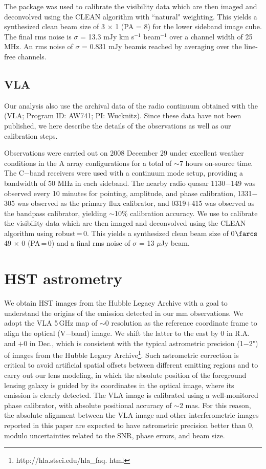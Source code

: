 \documentclass[]{emulateapj}
\begin{document}
The  package was used to calibrate the visibility data which are
then imaged and deconvolved using the CLEAN algorithm with ``natural" weighting. This yields a synthesized clean
beam size of 3 $\times$ 1 (PA = 8\degr) for the lower sideband
image cube. The final rms noise is $\sigma$ = 13.3 mJy km s$^{-1}$ beam$^{-1}$
over a channel width of 25 MHz. An rms noise of
$\sigma$ = 0.831 mJy beam\pmOne is reached by averaging over the
line-free channels.

\subsection{VLA} %
Our analysis also use the archival data of the radio continuum obtained with the \vla (VLA; Program ID: AW741; PI: Wucknitz). Since these data have not been
published, we here describe the details of the observations as well as our calibration steps.

Observations were carried out on 2008 December 29 under excellent weather
conditions in the A array configurations for a total of $\sim$7 hours on-source time. The C$-$band receivers were used with a continuum mode setup,
providing a bandwidth of 50 MHz in each sideband.
The nearby radio quasar 1130$-$149 was observed every 10 minutes for
pointing, amplitude, and phase calibration, 1331$-$305 was observed as the
primary flux calibrator, and 0319$+$415 was observed as the bandpass
calibrator, yielding $\sim$10\% calibration accuracy.
We use \aips to calibrate the visibility data which
are then imaged and deconvolved using
the CLEAN algorithm using robust\,=\,0. This yields a synthesized clean
beam size of 0$\farcs$49 $\times$ 0 (PA\,=\,0) and a final
rms noise of $\sigma$ = 13 $\mu$Jy beam\pmOne.


\section{HST astrometry} %
We obtain HST images from the Hubble Legacy Archive with
a goal to understand the origins of the emission detected
in our mm observations. We adopt the VLA 5\,GHz map of $\sim$0
resolution as the reference coordinate frame to align the optical (V$-$band) image.
We shift the latter to the east by 0 in R.A. and $+$0 in
Dec., which is consistent with the typical astrometric precision (1$-$2") of
images from the Hubble Legacy Archive\footnote{http://hla.stsci.edu/hla\_faq.
html}. Such astrometric correction is critical to avoid artificial spatial
offsets between different emitting regions and to carry out our lens modeling,
in which the absolute position of the foreground lensing galaxy is guided by its
coordinates in the optical image, where its emission is clearly detected.
The VLA image is calibrated using a well-monitored phase
calibrator, with absolute positional accuracy of $\sim$2 mas.
For this reason, the absolute alignment between the VLA image and other
interferometric images reported in this paper are expected to have astrometric
precision better than 0, modulo uncertainties related to the SNR, phase
errors, and beam size.
\end{document}

